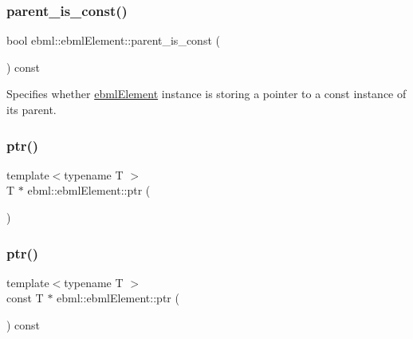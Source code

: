 \subsubsection{\texorpdfstring{parent\+\_\+is\+\_\+const()}{parent\_is\_const()}}
{\footnotesize\ttfamily bool ebml\+::ebml\+Element\+::parent\+\_\+is\+\_\+const (\begin{DoxyParamCaption}{ }\end{DoxyParamCaption}) const}

Specifies whether \mbox{\hyperlink{classebml_1_1ebmlElement}{ebml\+Element}} instance is storing a pointer to a const instance of its parent. \mbox{\label{classebml_1_1ebmlElement_a974c7505c6847f3e7411cbe7dbc91f50}} 
\subsubsection{\texorpdfstring{ptr()}{ptr()}\hspace{0.1cm}{\footnotesize\ttfamily [1/2]}}
{\footnotesize\ttfamily template$<$typename T $>$ \\
T $\ast$ ebml\+::ebml\+Element\+::ptr (\begin{DoxyParamCaption}{ }\end{DoxyParamCaption})}

\mbox{\label{classebml_1_1ebmlElement_a22297ffc67936033818a65c89f3564c0}} 
\subsubsection{\texorpdfstring{ptr()}{ptr()}\hspace{0.1cm}{\footnotesize\ttfamily [2/2]}}
{\footnotesize\ttfamily template$<$typename T $>$ \\
const T $\ast$ ebml\+::ebml\+Element\+::ptr (\begin{DoxyParamCaption}{ }\end{DoxyParamCaption}) const}

\mbox{\label{classebml_1_1ebmlElement_a445d4f6f882750005167411c4f7f24bf}} 
